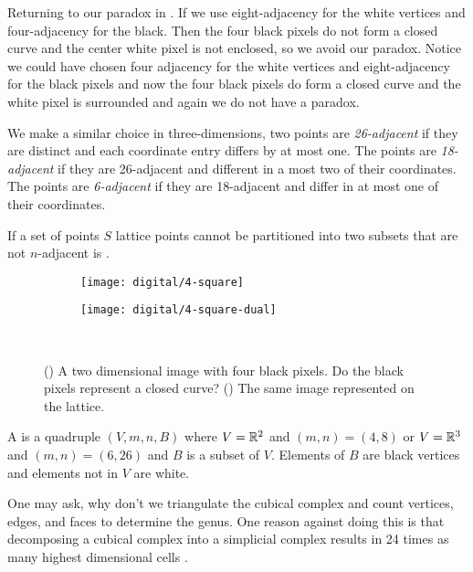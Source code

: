 Returning to our paradox in .
If we use eight-adjacency
for the white vertices and four-adjacency for the black.
Then the four black pixels do not form a closed curve 
and the center white pixel is not enclosed, so we avoid our paradox. 
Notice we could have chosen four adjacency
for the white vertices and eight-adjacency for the black pixels and 
now the four black pixels do form a closed curve and the white pixel
is surrounded and again we do not have a paradox.



We make a similar choice in three-dimensions, two points
are \emph{26-adjacent} if they are distinct and each coordinate 
entry differs by at most one.
The points are \emph{18-adjacent} if they are 26-adjacent
and different in  a most two of their coordinates.
The points are \emph{6-adjacent} if they are 18-adjacent and differ 
in at most one of their coordinates.

If a set of points $S$ lattice points cannot be
partitioned into two subsets that are not
$n$-adjacent is .



\begin{figure}[htb]
        \centering
        \begin{subfigure}[b]{0.3\textwidth}
        \texttt{[image: digital/4-square]}
        \caption{}
          \label{fig:4-square}
        \end{subfigure}
          \hspace{.3cm}
         \begin{subfigure}[b]{0.3\textwidth}
        \texttt{[image: digital/4-square-dual]}
        \caption{}
        \label{fig:4-square-dual}
        \end{subfigure}\\
		\caption{() A two dimensional image with four black pixels.
		Do the black pixels represent a closed curve? () The same image
		represented on the lattice.
		\label{fig:4-square-and-dual}}
\end{figure}

A  is a quadruple $(V,m,n,B)$ where
$V=\mathbb{R}^2$ and $(m,n)=(4,8)$ or $V=\mathbb{R}^3$ and $(m,n)=(6,26)$
and $B$ is a subset of $V$. Elements of $B$ are black vertices
and elements not in $V$ are white.


One may ask, why don't we triangulate the cubical complex and
count vertices, edges, and faces to determine the genus.
One reason against doing this is that 
decomposing a cubical complex into a simplicial complex
results in 24 times as many highest dimensional cells \cite{Kaczynski2003}.


